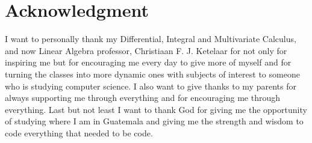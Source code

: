 \documentclass[letterpaper, conference]{IEEEtran}
\begin{document}
	
	

		
		
	
	
	\section*{Acknowledgment}
		I want to personally thank my Differential, Integral and Multivariate Calculus, and now Linear Algebra professor, Christiaan F. J. Ketelaar for not only for inspiring me but for encouraging me every day to give more of myself and for turning the classes into more dynamic ones with subjects of interest to someone who is studying computer science.  I also want to give thanks to my parents for always supporting me through everything and for encouraging me through everything. Last but not least I want to thank God for giving me the opportunity of studying where I am in Guatemala and giving me the strength and wisdom to code everything that needed to be code.
	
\end{document}
